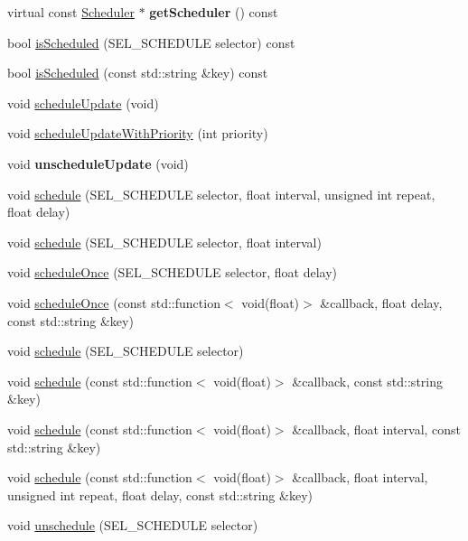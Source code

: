 \begin{Indent}
\begin{DoxyCompactItemize}
virtual const \hyperlink{classScheduler}{Scheduler} $\ast$ {\bfseries get\+Scheduler} () const
\item 
bool \hyperlink{classNode_a9b7c1b3796a8de31f3a9a962261f7c7e}{is\+Scheduled} (S\+E\+L\+\_\+\+S\+C\+H\+E\+D\+U\+LE selector) const
\item 
bool \hyperlink{classNode_a4c3c2f91272c93216d2122848078e574}{is\+Scheduled} (const std\+::string \&key) const
\item 
void \hyperlink{classNode_a8ff9ae5e15fe4d737da30f2b05f84c1c}{schedule\+Update} (void)
\item 
void \hyperlink{classNode_aa86137d5229cb83acf5cee129a83b818}{schedule\+Update\+With\+Priority} (int priority)
\item 
\mbox{\label{classNode_a4f4252bff36a5ce566ff66f80f9d38ee}} 
void {\bfseries unschedule\+Update} (void)
\item 
void \hyperlink{classNode_a5957efe46bfe7f83f9adb5b737f7ce11}{schedule} (S\+E\+L\+\_\+\+S\+C\+H\+E\+D\+U\+LE selector, float interval, unsigned int repeat, float delay)
\item 
void \hyperlink{classNode_a7cf87e23665a003982321d5e4fc98c11}{schedule} (S\+E\+L\+\_\+\+S\+C\+H\+E\+D\+U\+LE selector, float interval)
\item 
void \hyperlink{classNode_a85353a5e8ae9f374001fa9f89ccc9adb}{schedule\+Once} (S\+E\+L\+\_\+\+S\+C\+H\+E\+D\+U\+LE selector, float delay)
\item 
void \hyperlink{classNode_a733ed19d0f4bbffcab1536b43ce8407d}{schedule\+Once} (const std\+::function$<$ void(float)$>$ \&callback, float delay, const std\+::string \&key)
\item 
void \hyperlink{classNode_a9f0944b744eb47a227780375597ba997}{schedule} (S\+E\+L\+\_\+\+S\+C\+H\+E\+D\+U\+LE selector)
\item 
void \hyperlink{classNode_a30934785a4592d0704ce952e47f69664}{schedule} (const std\+::function$<$ void(float)$>$ \&callback, const std\+::string \&key)
\item 
void \hyperlink{classNode_ac48adc693c721c34a98357c088f2d97a}{schedule} (const std\+::function$<$ void(float)$>$ \&callback, float interval, const std\+::string \&key)
\item 
void \hyperlink{classNode_ac771b98b6729cc3845fd95cc74c3ae41}{schedule} (const std\+::function$<$ void(float)$>$ \&callback, float interval, unsigned int repeat, float delay, const std\+::string \&key)
\item 
void \hyperlink{classNode_a04fd599a10f38d31fa0c07bfda6cc90c}{unschedule} (S\+E\+L\+\_\+\+S\+C\+H\+E\+D\+U\+LE selector)

\end{DoxyCompactItemize}
\end{Indent}
